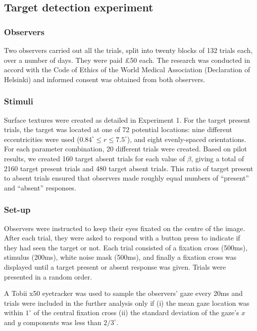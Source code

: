 \documentclass[man]{apa6}
\begin{document}
\subsection{Target detection experiment}


\subsubsection{Observers}

Two observers carried out all the trials, split into twenty blocks of 132 trials each, over a number of days. They were paid \pounds50 each. The research was conducted in accord with the Code of Ethics of the World Medical Association (Declaration of Helsinki) and informed consent was obtained from both observers. 

\subsubsection{Stimuli}

Surface textures were created as detailed in Experiment 1. For the target present trials, the target was located at one of 72 potential locations: nine different eccentricities were used ($0.84^{\circ}\leq r\leq 7.5^{\circ}$), and eight evenly-spaced orientations. For each parameter combination, 20 different trials were created.  Based on pilot results, we created 160 target absent trials for each value of $\beta$, giving a total of 2160 target present trials and 480 target absent trials. This ratio of target present to absent trials ensured that observers made roughly equal numbers of ``present'' and ``absent'' responses.

\subsubsection{Set-up}

Observers were instructed to keep their eyes fixated on the centre of the image. After each trial, they were asked to respond with a button press to indicate if they had seen the target or not.  Each trial consisted of a fixation cross (500ms), stimulus (200ms), white noise mask (500ms), and finally a fixation cross was displayed until a target present or absent response was given. Trials were presented in a random order. 
\par
A Tobii x50 eyetracker was used to sample the observers' gaze every 20ms and trials were included in the further analysis only if (i) the mean gaze location was within $1^{\circ}$ of the central fixation cross (ii) the standard deviation of the gaze's $x$ and $y$ components was less than $2/3^{\circ}$.
\end{document}
